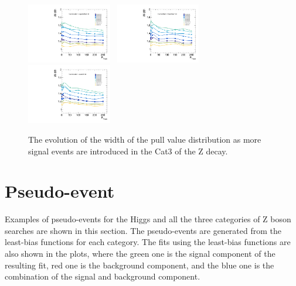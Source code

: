 \begin{figure}[!ht]
  \includegraphics[width=0.33\textwidth]{Fig/BiasStudy/Linearity/ZJpsiG_Cat3/pull_width_linearity_TrueFunc6}~
  \includegraphics[width=0.33\textwidth]{Fig/BiasStudy/Linearity/ZJpsiG_Cat3/pull_width_linearity_TrueFunc7}~
  \includegraphics[width=0.33\textwidth]{Fig/BiasStudy/Linearity/ZJpsiG_Cat3/pull_width_linearity_TrueFunc8}\\
  \caption{The evolution of the width of the pull value distribution as more signal events are introduced in the Cat3 of the Z decay.\label{fig:Linearity_width_ZJpsiG_Cat3}}
\end{figure}
\clearpage
%
\section{Pseudo-event}
Examples of pseudo-events for the Higgs and all the three categories of Z boson searches are shown in this section. 
The pseudo-events are generated from the least-bias functions for each category. The fits using the least-bias functions are also shown in the plots, where the green one is the signal component of the resulting fit, red one is the background component, and the blue one is the combination of the signal and background component.
\clearpage
